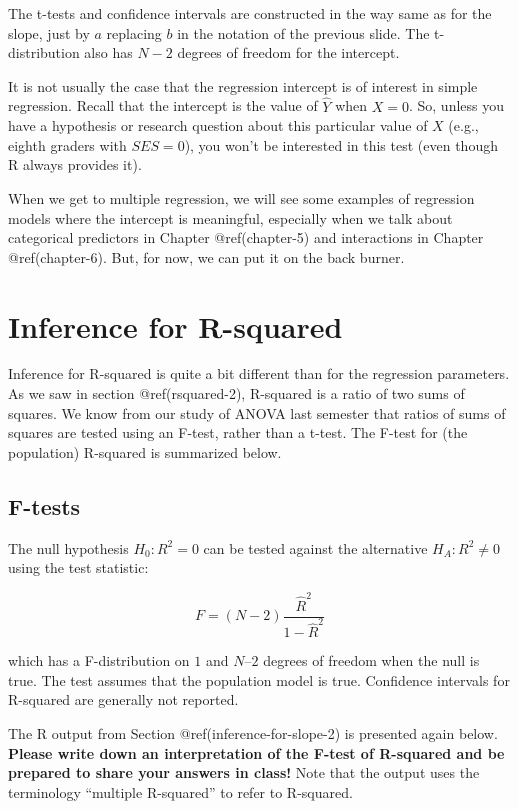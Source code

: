 \documentclass[
  letterpaper,
  DIV=11,
  numbers=noendperiod]{scrreprt}
\begin{document}
The t-tests and confidence intervals are constructed in the way same as
for the slope, just by \(a\) replacing \(b\) in the notation of the
previous slide. The t-distribution also has \(N-2\) degrees of freedom
for the intercept.

It is not usually the case that the regression intercept is of interest
in simple regression. Recall that the intercept is the value of
\(\widehat Y\) when \(X = 0\). So, unless you have a hypothesis or
research question about this particular value of \(X\) (e.g., eighth
graders with \(SES = 0\)), you won't be interested in this test (even
though R always provides it).

When we get to multiple regression, we will see some examples of
regression models where the intercept is meaningful, especially when we
talk about categorical predictors in Chapter @ref(chapter-5) and
interactions in Chapter @ref(chapter-6). But, for now, we can put it on
the back burner.

\hypertarget{inference-for-rsquared-2}{%
\section{Inference for R-squared}\label{inference-for-rsquared-2}}

Inference for R-squared is quite a bit different than for the regression
parameters. As we saw in section @ref(rsquared-2), R-squared is a ratio
of two sums of squares. We know from our study of ANOVA last semester
that ratios of sums of squares are tested using an F-test, rather than a
t-test. The F-test for (the population) R-squared is summarized below.

\hypertarget{f-tests-1}{%
\subsection{F-tests}\label{f-tests-1}}

The null hypothesis \(H_0: R^2 = 0\) can be tested against the
alternative \(H_A: R^2 \neq 0\) using the test statistic:

\[ F = (N-2) \frac{\widehat R^2}{1-\widehat R^2} \]

which has a F-distribution on \(1\) and \(N – 2\) degrees of freedom
when the null is true. The test assumes that the population model is
true. Confidence intervals for R-squared are generally not reported.

The R output from Section @ref(inference-for-slope-2) is presented again
below. \textbf{Please write down an interpretation of the F-test of
R-squared and be prepared to share your answers in class!} Note that the
output uses the terminology ``multiple R-squared'' to refer to
R-squared.
\end{document}
